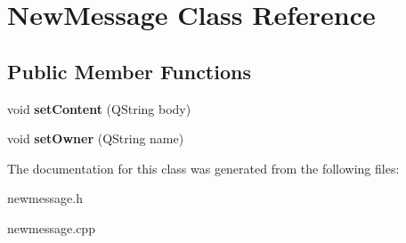 \hypertarget{classNewMessage}{\section{New\-Message Class Reference}
\label{classNewMessage}
}
\subsection*{Public Member Functions}
\begin{DoxyCompactItemize}
\item 
\hypertarget{classNewMessage_a773fd0b0f79708c8f368e615711c696c}{void {\bfseries set\-Content} (Q\-String body)}\label{classNewMessage_a773fd0b0f79708c8f368e615711c696c}

\item 
\hypertarget{classNewMessage_a9660f536eacf3c6c2a04bc5ba883f8fa}{void {\bfseries set\-Owner} (Q\-String name)}\label{classNewMessage_a9660f536eacf3c6c2a04bc5ba883f8fa}

\end{DoxyCompactItemize}


The documentation for this class was generated from the following files\-:\begin{DoxyCompactItemize}
\item 
newmessage.\-h\item 
newmessage.\-cpp\end{DoxyCompactItemize}

